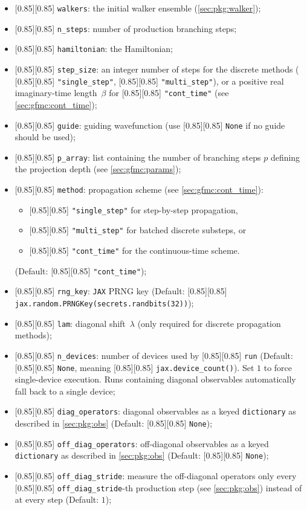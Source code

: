 \documentclass{SciPost}
\newcommand{\pyinline}[1]{\begingroup\setlength{\fboxsep}{0pt}%
  \colorbox{gray!15}{\raisebox{0pt}[0.85\ht\strutbox][0.85\dp\strutbox]{%
    \hspace{1pt}\lstinline{#1}\hspace{1pt}}}\endgroup}
\newcommand{\JAX}{\texttt{JAX}}
\begin{document}
\begin{itemize}
	\item \pyinline{walkers}: the initial walker ensemble (\autoref{sec:pkg:walker});
	\item \pyinline{n_steps}: number of production branching steps;
	\item \pyinline{hamiltonian}: the Hamiltonian;
	\item \pyinline{step_size}: an integer number of steps for the discrete methods (\pyinline{"single_step"}, \pyinline{"multi_step"}), or a positive real imaginary-time length~$\beta$ for \pyinline{"cont_time"} (see \autoref{sec:gfmc:cont_time});
	\item \pyinline{guide}: guiding wavefunction (use \pyinline{None} if no guide should be used);
	\item \pyinline{p_array}: list containing the number of branching steps $p$ defining the projection depth (see \autoref{sec:gfmc:params});
	\item \pyinline{method}: propagation scheme (see \autoref{sec:gfmc:cont_time}):
			\begin{itemize}
	      	\item \pyinline{"single_step"} for step-by-step propagation,
	      	\item \pyinline{"multi_step"} for batched discrete substeps, or
	      	\item \pyinline{"cont_time"} for the continuous-time scheme.
			\end{itemize}
	       (Default: \pyinline{"cont_time"});
	\item \pyinline{rng_key}: \JAX{} PRNG key (Default: \pyinline{jax.random.PRNGKey(secrets.randbits(32))});
	\item \pyinline{lam}: diagonal shift~$\lambda$ (only required for discrete propagation methods);
   \item \pyinline{n_devices}: number of devices used by \pyinline{run} (Default: \pyinline{None}, meaning \pyinline{jax.device_count()}).
   Set $1$ to force single-device execution.
   Runs containing diagonal observables automatically fall back to a single device;
   \item \pyinline{diag_operators}: diagonal observables as a keyed \texttt{dictionary} as described in \autoref{sec:pkg:obs} (Default: \pyinline{None});
   \item \pyinline{off_diag_operators}: off-diagonal observables as a keyed \texttt{dictionary} as described in \autoref{sec:pkg:obs} (Default: \pyinline{None});
	\item \pyinline{off_diag_stride}: measure the off-diagonal operators only every \pyinline{off_diag_stride}-th production step (see \autoref{sec:pkg:obs}) instead of at every step (Default: $1$);

\end{itemize}
\end{document}
